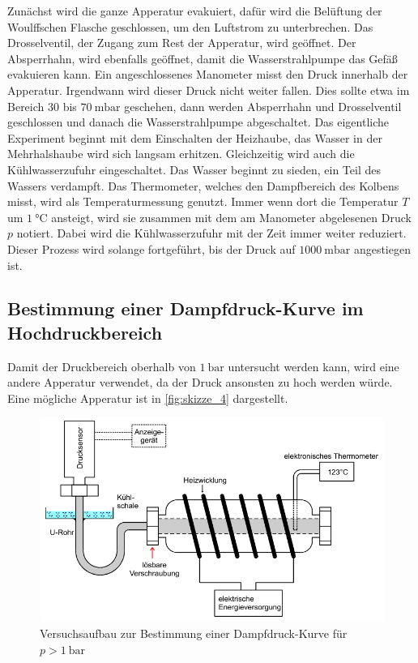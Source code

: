 Zunächst wird die ganze Apperatur evakuiert, dafür wird die Belüftung der Woulffschen Flasche geschlossen, um den Luftstrom zu unterbrechen.
Das Drosselventil, der Zugang zum Rest der Apperatur, wird geöffnet.
Der Absperrhahn, wird ebenfalls geöffnet, damit die Wasserstrahlpumpe das Gefäß evakuieren kann.
Ein angeschlossenes Manometer misst den Druck innerhalb der Apperatur.
Irgendwann wird dieser Druck nicht weiter fallen.
Dies sollte etwa im Bereich $30$ bis $\SI{70}{\milli\bar}$ geschehen, dann werden Absperrhahn und Drosselventil geschlossen und danach die Wasserstrahlpumpe abgeschaltet.
Das eigentliche Experiment beginnt mit dem Einschalten der Heizhaube, das Wasser in der Mehrhalshaube wird sich langsam erhitzen.
Gleichzeitig wird auch die Kühlwasserzufuhr eingeschaltet.
Das Wasser beginnt zu sieden, ein Teil des Wassers verdampft.
Das Thermometer, welches den Dampfbereich des Kolbens misst, wird als Temperaturmessung genutzt.
Immer wenn dort die Temperatur $T$ um $\SI{1}{\celsius}$ ansteigt, wird sie zusammen mit dem am Manometer abgelesenen Druck $p$ notiert.
Dabei wird die Kühlwasserzufuhr mit der Zeit immer weiter reduziert.
Dieser Prozess wird solange fortgeführt, bis der Druck auf $\SI{1000}{\milli\bar}$ angestiegen ist.

\subsection{Bestimmung einer Dampfdruck-Kurve im Hochdruckbereich}
\label{sec:Durchführung_hochdruck}

Damit der Druckbereich oberhalb von $\SI{1}{\bar}$ untersucht werden kann, wird eine andere Apperatur verwendet, da der Druck ansonsten zu hoch werden würde.
Eine mögliche Apperatur ist in \autoref{fig:skizze_4} dargestellt.

\begin{figure}
    \centering
    \includegraphics[width=\textwidth/2]{images/bild4.png}
    \caption{Versuchsaufbau zur Bestimmung einer Dampfdruck-Kurve für $p > \SI{1}{\bar}$ \cite{V203}}
    \label{fig:skizze_4}
\end{figure}

